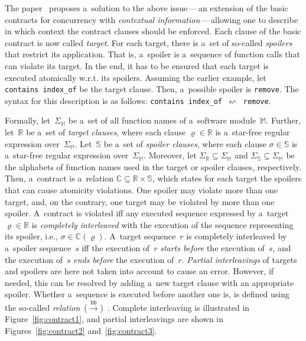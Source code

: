 The paper~\cite{contracts2017} proposes a~solution to the above issue\,---\,an extension of the basic contracts for concurrency with \emph{contextual information}\,---\,allowing one to describe in which context the contract clauses should be enforced. Each clause of the basic contract is now called \emph{target}. For each target, there is a~set of so-called \emph{spoilers} that restrict its application. That is, a~spoiler is a~sequence of function calls that can violate its target. In the end, it has to be ensured that each target is executed atomically w.r.t. its spoilers. Assuming the earlier example, let \texttt{contains index\_of} be the target clause. Then, a~possible spoiler is \texttt{remove}. The syntax for this description is as follows: \texttt{contains index\_of}\ $ \leftsquigarrow $\ \texttt{remove}.

Formally, let~$ \Sigma_\mathbb{M} $ be a~set of all function names of a~software module~$ \mathbb{M} $. Further, let~$ \mathbb{R} $ be a~set of \emph{target clauses}, where each clause $ \varrho \in \mathbb{R} $ is a~star-free regular expression over~$ \Sigma_\mathbb{M} $. Let~$ \mathbb{S} $ be a~set of \emph{spoiler clauses}, where each clause $ \sigma \in \mathbb{S} $ is a~star-free regular expression over~$ \Sigma_\mathbb{M} $. Moreover, let $ \Sigma_\mathbb{R} \subseteq \Sigma_\mathbb{M} $ and $ \Sigma_\mathbb{S} \subseteq \Sigma_\mathbb{M} $ be the alphabets of function names used in the target or spoiler clauses, respectively. Then, a~contract is a~relation $ \mathbb{C} \subseteq \mathbb{R} \times \mathbb{S} $, which states for each target the spoilers that can cause atomicity violations. One spoiler may violate more than one target, and, on the contrary, one target may be violated by more than one spoiler. A~contract is violated iff any executed sequence expressed by a~target $ \varrho \in \mathbb{R} $ is \emph{completely interleaved} with the execution of the sequence representing its spoiler, i.e., $ \sigma \in \mathbb{C}(\varrho) $. A~target sequence~$ r $ is completely interleaved by a~spoiler sequence~$ s $ iff the execution of~$ r $ \emph{starts before} the execution of~$ s $, and the execution of~$ s $ \emph{ends before} the execution of~$ r $. \emph{Partial interleavings} of targets and spoilers are here not taken into account to cause an error. However, if needed, this can be resolved by adding a~new target clause with an appropriate spoiler. Whether a~sequence is executed before another one is, is defined using the so-called \emph{ relation}~($ \xrightarrow{\mathtt{hb}} $)~\cite{lamportHb}. Complete interleaving is illustrated in Figure~\ref{fig:contract1}, and partial interleavings are shown in Figures~\ref{fig:contract2} and~\ref{fig:contract3}.

